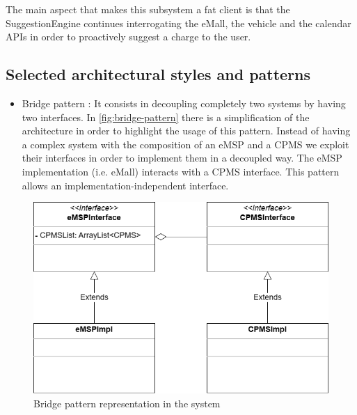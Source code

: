 The main aspect that makes this subsystem a fat client is that the SuggestionEngine continues interrogating the eMall, the vehicle and the calendar \acp{API} in order to proactively suggest a charge to the user.

\subsection{Selected architectural styles and patterns}
\begin{itemize}
    \item Bridge pattern \cite{ref:bridge-pattern}: It consists in decoupling completely two systems by having two interfaces. In \autoref{fig:bridge-pattern} there is a simplification of the architecture in order to highlight the usage of this pattern.
          Instead of having a complex system with the composition of an \ac{eMSP} and a \ac{CPMS} we exploit their interfaces in order to implement them in a decoupled way. The \ac{eMSP} implementation (i.e. \ac{eMall}) interacts with a \ac{CPMS} interface. This pattern allows an implementation-independent interface. \label{pattern:bridge}
\end{itemize}

\begin{figure}[!h]
    \begin{center}
        \includegraphics[keepaspectratio, width=12cm]{Graphics/DD-bridge-pattern.drawio.png}
        \caption{Bridge pattern representation in the system}
        \label{fig:bridge-pattern}
    \end{center}
\end{figure}


